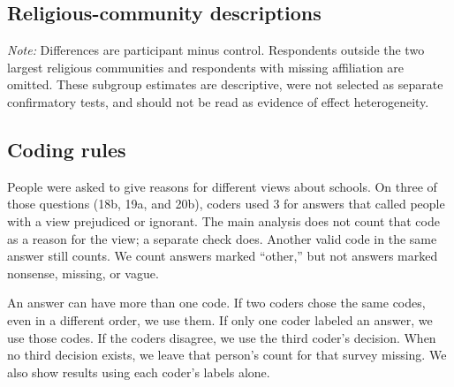 \documentclass{article}
\begin{document}
\clearpage
\subsection{Religious-community descriptions}

\begin{table}[H]
\centering
\caption{T3 total repertoires by religious community}
\resizebox{0.98\textwidth}{!}{%

}
\begin{minipage}{0.95\textwidth}
\smallskip\footnotesize
\textit{Note:} Differences are participant minus control. Respondents outside the two largest
religious communities and respondents with missing affiliation are omitted. These subgroup
estimates are descriptive, were not selected as separate confirmatory tests, and should not be
read as evidence of effect heterogeneity.
\end{minipage}
\end{table}

\subsection{Coding rules}

People were asked to give reasons for different views about schools. On three of those
questions (18b, 19a, and 20b), coders used 3 for answers that called people with a view
prejudiced or ignorant. The main analysis does not count that code as a reason for the view;
a separate check does. Another valid code in the same answer still counts. We count answers
marked ``other,'' but not answers marked nonsense, missing, or vague.

An answer can have more than one code. If two coders chose the same codes, even in a different
order, we use them. If only one coder labeled an answer, we use those codes. If the coders
disagree, we use the third coder's decision. When no third decision exists, we leave that
person's count for that survey missing. We also show results using each coder's labels alone.
\end{document}
